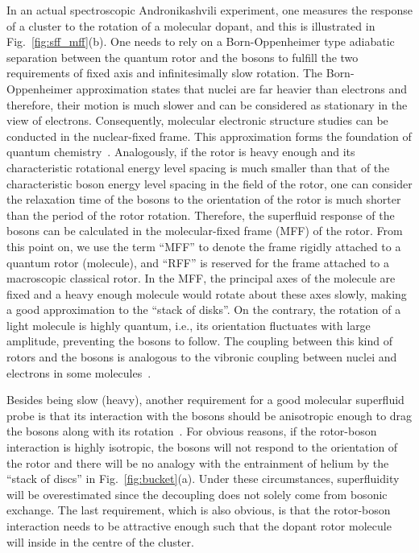 \documentclass[12pt]{iopart}
\begin{document}
In an actual spectroscopic Andronikashvili experiment, one measures the response of a cluster to the rotation of a molecular dopant, and this is illustrated in Fig.~\ref{fig:sff_mff}(b). 
One needs to rely on a Born-Oppenheimer type adiabatic separation between the quantum rotor and the bosons to fulfill the two requirements of fixed axis and infinitesimally slow rotation. 
The Born-Oppenheimer approximation states that nuclei are far heavier than electrons and therefore, 
their motion is much slower and can be considered as stationary in the view of electrons. 
Consequently, molecular electronic structure studies can be conducted in the nuclear-fixed frame. 
This approximation forms the foundation of quantum chemistry~\cite{szabo_book,mol_ele_stru_theo,cramer_book,levine_qc5,jensen_book,piela_book}. 
Analogously, if the rotor is heavy enough and its characteristic rotational energy level spacing is much smaller than that of the characteristic boson energy level spacing in the field of the rotor, one can consider the relaxation time of the bosons to the orientation of the rotor is much shorter than the period of the rotor rotation. 
Therefore, the superfluid response of the bosons can be calculated in the molecular-fixed frame (MFF) of the rotor. 
From this point on, we use the term ``MFF'' to denote the frame rigidly attached to a quantum rotor (molecule), and ``RFF'' is reserved for the frame attached to a macroscopic classical rotor. 
In the MFF, the principal axes of the molecule are fixed and a heavy enough molecule would rotate about these axes slowly, making a good approximation to the ``stack of disks''. 
On the contrary, the rotation of a light molecule is highly quantum, i.e., its orientation fluctuates with large amplitude, preventing the bosons to follow. 
The coupling between this kind of rotors and the bosons is analogous to the vibronic coupling between nuclei and electrons in some molecules~\cite{bersuker_1989,fischer_vc,bersuker_2006,bersuker_2008}.

Besides being slow (heavy), 
another requirement for a good molecular superfluid probe is that its interaction 
with the bosons should be anisotropic enough to drag the bosons along with its rotation~\cite{tang_briding_bap,mak_ch4_he,renorm_nh3_he}. 
For obvious reasons, if the rotor-boson interaction is highly isotropic, 
the bosons will not respond to the orientation of the rotor and there will be no analogy with the entrainment of helium by the ``stack of discs'' in Fig.~\ref{fig:bucket}(a). 
Under these circumstances, superfluidity will be overestimated since the decoupling does not solely come from bosonic exchange. 
The last requirement, which is also obvious, is that the rotor-boson interaction needs to be attractive enough such that the dopant rotor molecule will inside in the centre of the cluster.
\end{document}
